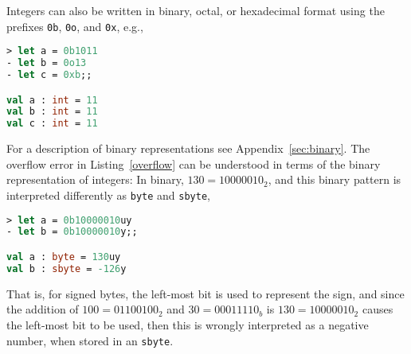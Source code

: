 Integers can also be written in binary, octal, or hexadecimal format using the prefixes \lstinline|0b|, \lstinline|0o|, and \lstinline|0x|, e.g.,
%
\begin{lstlisting}[language=fsharp,caption={fsharpi, integer types may be specified as binary, octal, and hexadecimal numbers.}]
> let a = 0b1011
- let b = 0o13
- let c = 0xb;;

val a : int = 11
val b : int = 11
val c : int = 11
\end{lstlisting}
For a description of binary representations see Appendix~\ref{sec:binary}. The overflow error in Listing~\ref{overflow} can be understood in terms of the binary representation of integers: In binary, $130=10000010_2$, and this binary pattern is interpreted differently as \lstinline{byte} and \lstinline{sbyte},
%
\begin{lstlisting}[language=fsharp,caption={fsharpi, the left most bit is interpreted differently for signed and unsigned integers, which gives rise to potential overflow errors.}]
> let a = 0b10000010uy
- let b = 0b10000010y;;

val a : byte = 130uy
val b : sbyte = -126y
\end{lstlisting}
That is, for signed bytes, the left-most bit is used to represent the sign, and since the addition of $100=01100100_2$ and $30=00011110_b$ is $130=10000010_2$ causes the left-most bit to be used, then this is wrongly interpreted as a negative number, when stored in an \lstinline{sbyte}.

